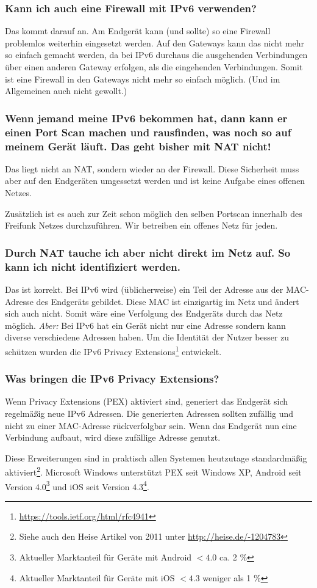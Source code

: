 \documentclass[10pt,a4paper,oneside]{scrartcl}
\begin{document}
\subsubsection*{Kann ich auch eine Firewall mit IPv6 verwenden?}
Das kommt darauf an. Am Endgerät kann (und sollte) so eine Firewall problemlos
weiterhin eingesetzt werden.
Auf den Gateways kann das nicht mehr so einfach gemacht werden, da bei IPv6
durchaus die ausgehenden Verbindungen über einen anderen Gateway erfolgen,
als die eingehenden Verbindungen. Somit ist eine Firewall in den Gateways
nicht mehr so einfach möglich. (Und im Allgemeinen auch nicht gewollt.)

\subsubsection*{Wenn jemand meine IPv6 bekommen hat, dann kann er einen Port Scan
machen und rausfinden, was noch so auf meinem Gerät läuft. Das geht bisher mit NAT nicht!}
Das liegt nicht an NAT, sondern wieder an der Firewall. Diese Sicherheit muss aber auf den
Endgeräten umgessetzt werden und ist keine Aufgabe eines offenen Netzes.

Zusätzlich ist es auch zur Zeit schon möglich den selben Portscan innerhalb
des Freifunk Netzes durchzuführen. Wir betreiben ein offenes Netz für jeden.

\subsubsection*{Durch NAT tauche ich aber nicht direkt im Netz auf. So kann ich nicht identifiziert werden.}
Das ist korrekt. Bei IPv6 wird (üblicherweise) ein Teil der Adresse aus der MAC-Adresse des Endgeräts gebildet. Diese MAC ist einzigartig im Netz und ändert sich auch nicht. Somit wäre eine Verfolgung des Endgeräts durch das Netz möglich.
\emph{Aber: }Bei IPv6 hat ein Gerät nicht nur eine Adresse sondern kann diverse verschiedene Adressen haben.
Um die Identität der Nutzer besser zu schützen wurden die IPv6 Privacy Extensions\footnote{\url{https://tools.ietf.org/html/rfc4941}} entwickelt.

\subsubsection*{Was bringen die IPv6 Privacy Extensions?}
Wenn Privacy Extensions (PEX) aktiviert sind, generiert das Endgerät sich regelmäßig
neue IPv6 Adressen. Die generierten Adressen sollten zufällig und nicht zu einer MAC-Adresse rückverfolgbar sein. Wenn das Endgerät nun eine Verbindung aufbaut, wird diese zufällige Adresse genutzt.

Diese Erweiterungen sind in praktisch allen Systemen heutzutage standardmäßig aktiviert\footnote{Siehe auch den Heise Artikel von 2011 unter \url{http://heise.de/-1204783}}. Microsoft Windows unterstützt PEX seit Windows XP, Android seit Version 4.0\footnote{%
Aktueller Marktanteil für Geräte mit Android $ < 4.0 $ ca. 2 \% } und iOS seit Version 4.3\footnote{%
Aktueller Marktanteil für Geräte mit iOS $ < 4.3 $ weniger als 1 \% }.
\end{document}
